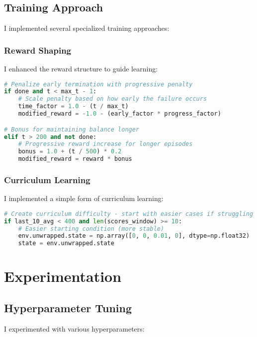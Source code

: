 \documentclass[11pt,a4paper]{article}
\begin{document}
\subsection{Training Approach}

I implemented several specialized training approaches:

\subsubsection{Reward Shaping}
I enhanced the reward structure to guide learning:

\begin{lstlisting}[language=Python, caption=Reward Shaping]
# Penalize early termination with progressive penalty
if done and t < max_t - 1:
    # Scale penalty based on how early the failure occurs
    time_factor = 1.0 - (t / max_t)
    modified_reward = -1.0 - (early_factor * progress_factor)

# Bonus for maintaining balance longer
elif t > 200 and not done:
    # Progressive reward increase for longer episodes
    bonus = 1.0 + (t / 500) * 0.2
    modified_reward = reward * bonus
\end{lstlisting}

\subsubsection{Curriculum Learning}
I implemented a simple form of curriculum learning:

\begin{lstlisting}[language=Python, caption=Curriculum Learning]
# Create curriculum difficulty - start with easier cases if struggling
if last_10_avg < 400 and len(scores_window) >= 10:
    # Easier starting condition (more stable)
    env.unwrapped.state = np.array([0, 0, 0.01, 0], dtype=np.float32)
    state = env.unwrapped.state
\end{lstlisting}

\section{Experimentation}

\subsection{Hyperparameter Tuning}

I experimented with various hyperparameters:
\end{document}
